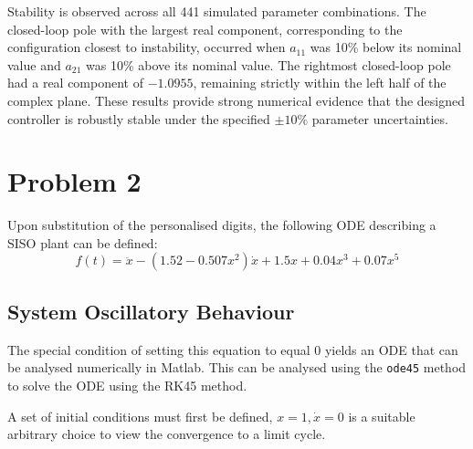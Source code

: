 \documentclass[conference,onecolumn,a4paper,11pt]{IEEEtran}
\begin{document}
Stability is observed across all 441 simulated parameter combinations. The closed-loop pole with the largest real component, corresponding to the configuration closest to instability, occurred when \(a_{11}\) was 10\% below its nominal value and \(a_{21}\) was 10\% above its nominal value. The rightmost closed-loop pole had a real component of \(-1.0955\), remaining strictly within the left half of the complex plane. These results provide strong numerical evidence that the designed controller is robustly stable under the specified \(\pm 10\%\) parameter uncertainties.

\clearpage
\section{Problem 2}
Upon substitution of the personalised digits, the following ODE describing a SISO plant can be defined: 
\begin{equation}
    f(t) = \ddot{x} - \left( 1.52 - 0.507 x^2 \right) \dot{x} + 1.5x + 0.04x^3 + 0.07x^5
    \label{eq:prob2_ode}
\end{equation}

\subsection{System Oscillatory Behaviour}
The special condition of setting this equation to equal 0 yields an ODE that can be analysed numerically in Matlab. This can be analysed using the \texttt{ode45} method to solve the ODE using the RK45 method.~\cite{mathworks:ode45}

A set of initial conditions must first be defined, $x = 1, \dot{x} = 0$ is a suitable arbitrary choice to view the convergence to a limit cycle. 
\end{document}

